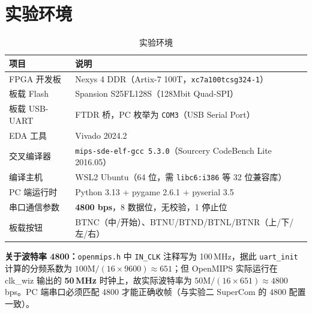 \section{实验环境}

\begin{table}[H]
    \centering
    \begin{tabular}{ll}
        \toprule
        \textbf{项目} & \textbf{说明} \\
        \midrule
        FPGA 开发板 & Nexys 4 DDR（Artix-7 100T，\texttt{xc7a100tcsg324-1}） \\
        板载 Flash & Spansion S25FL128S（128Mbit Quad-SPI） \\
        板载 USB-UART & FTDR 桥，PC 枚举为 \texttt{COM3}（USB Serial Port） \\
        EDA 工具 & Vivado 2024.2 \\
        交叉编译器 & \texttt{mips-sde-elf-gcc 5.3.0}（Sourcery CodeBench Lite 2016.05） \\
        编译主机 & WSL2 Ubuntu（64 位，需 \texttt{libc6:i386} 等 32 位兼容库） \\
        PC 端运行时 & Python 3.13 + pygame 2.6.1 + pyserial 3.5 \\
        串口通信参数 & \textbf{4800 bps}，8 数据位，无校验，1 停止位 \\
        板载按钮 & BTNC（中/开始）、BTNU/BTND/BTNL/BTNR（上/下/左/右） \\
        \bottomrule
    \end{tabular}
    \caption{实验环境}
\end{table}

\noindent \textbf{关于波特率 4800：}\texttt{openmips.h} 中 \texttt{IN\_CLK} 注释写为 100\,MHz，据此 \texttt{uart\_init} 计算的分频系数为 $100\text{M}/(16\times 9600)\approx 651$；但 OpenMIPS 实际运行在 clk\_wiz 输出的 \textbf{50\,MHz} 时钟上，故实际波特率为 $50\text{M}/(16\times 651)\approx 4800$\,bps。PC 端串口必须匹配 4800 才能正确收帧（与实验二 SuperCom 的 4800 配置一致）。

